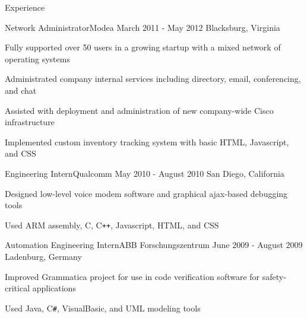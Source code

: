 \documentclass{resume}
\begin{document}
\begin{section}{Experience}
		\begin{experience}{Network Administrator}{Modea}
		                  {March 2011 - May 2012} %
		                  {Blacksburg, Virginia}
			\item Fully supported over 50 users in a growing startup with a mixed
			      network of operating systems
			\item Administrated company internal services including directory, email,
			      conferencing, and chat
			\item Assisted with deployment and administration of new company-wide
			      Cisco infrastructure
			\item Implemented custom inventory tracking system with basic HTML,
			      Javascript, and CSS
		\end{experience}

		\begin{experience}{Engineering Intern}{Qualcomm}
		                  {May 2010 - August 2010} %
		                  {San Diego, California}
			\item Designed low-level voice modem software and graphical ajax-based
			      debugging tools
			\item Used ARM assembly, C, C\texttt{++}, Javascript, HTML, and CSS
		\end{experience}

		\begin{experience}{Automation Engineering Intern}{ABB Forschungszentrum}
		                  {June 2009 - August 2009} %
		                  {Ladenburg, Germany}
			\item Improved Grammatica project for use in code verification software
			      for safety-critical applications
			\item Used Java, C\texttt{\#}, VisualBasic, and UML modeling tools
		\end{experience}

	\end{section}
\end{document}
